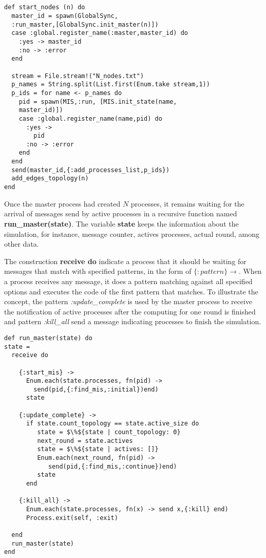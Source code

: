 \begin{lstlisting}[frame=single, columns=fullflexible, mathescape=true, caption= start\_nodes function, label = code:start]


def start_nodes (n) do
  master_id = spawn(GlobalSync,
  :run_master,[GlobalSync.init_master(n)])
  case :global.register_name(:master,master_id) do
    :yes -> master_id
    :no -> :error
  end

  stream = File.stream!("N_nodes.txt")
  p_names = String.split(List.first(Enum.take stream,1))
  p_ids = for name <- p_names do
    pid = spawn(MIS,:run, [MIS.init_state(name,
    master_id)])
    case :global.register_name(name,pid) do
      :yes ->
        pid
      :no -> :error
    end
  end
  send(master_id,{:add_processes_list,p_ids})
  add_edges_topology(n)
end
\end{lstlisting}


Once the master process had created $N$ processes, it remains waiting for the arrival of messages send by active processes in a recursive function named \textbf{run\_master(state)}. The variable \textbf{state} keeps the information about the simulation, for instance, message counter, actives processes, actual round, among other data.

 The construction \textbf{receive do} indicate a process that  it should be waiting for messages that match with specified patterns, in the form of $\{:pattern\} \rightarrow$. When a process receives any message, it does a pattern matching against all specified options and executes the code of the first pattern that matches. To illustrate the concept, the pattern \textit{:update\_complete} is used by the master process to receive the notification of active processes after the computing for one round is finished and pattern \textit{:kill\_all} send a message indicating processes to finish the simulation. 

\begin{lstlisting}[frame=single, columns=fullflexible, mathescape=true, caption= run\_master function for master, label = code:run]
def run_master(state) do
state =
  receive do

    {:start_mis} ->
      Enum.each(state.processes, fn(pid) ->
        send(pid,{:find_mis,:initial})end)
      state

    {:update_complete} ->
      if state.count_topology == state.active_size do
         state = $\%${state | count_topology: 0}
         next_round = state.actives
         state = $\%${state | actives: []}
         Enum.each(next_round, fn(pid) -> 
            send(pid,{:find_mis,:continue})end)
         state
      end
        
    {:kill_all} ->
      Enum.each(state.processes, fn(x) -> send x,{:kill} end)
      Process.exit(self, :exit)
      
  end
  run_master(state)
end

\end{lstlisting}


